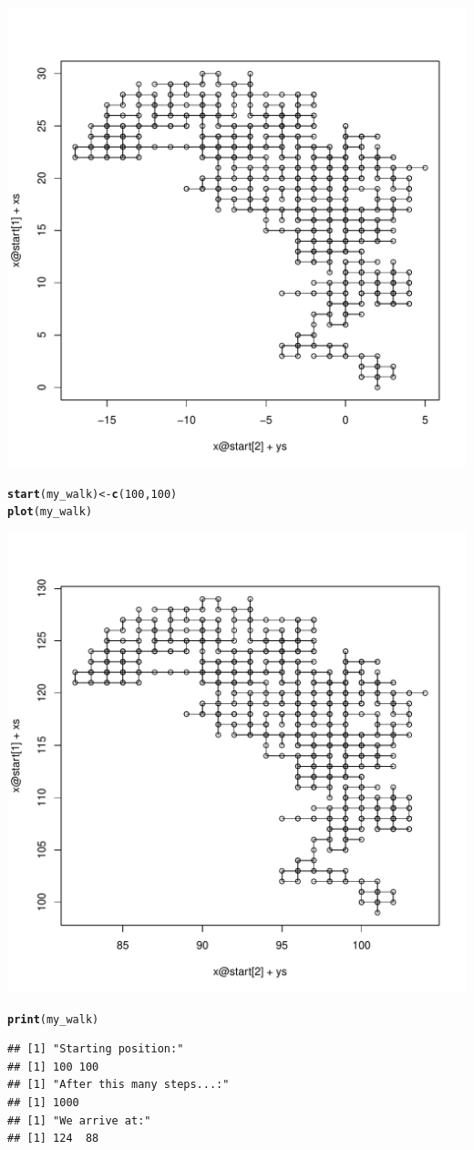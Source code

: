 \documentclass{article}\usepackage[]{graphicx}\usepackage[]{color}
\makeatletter
\def\maxwidth{ %
  \ifdim\Gin@nat@width>\linewidth
    \linewidth
  \else
    \Gin@nat@width
  \fi
}
\newcommand{\hlnum}[1]{\textcolor[rgb]{0.686,0.059,0.569}{#1}}%
\newcommand{\hlstd}[1]{\textcolor[rgb]{0.345,0.345,0.345}{#1}}%
\newcommand{\hlkwb}[1]{\textcolor[rgb]{0.69,0.353,0.396}{#1}}%
\newcommand{\hlkwd}[1]{\textcolor[rgb]{0.737,0.353,0.396}{\textbf{#1}}}%
\newenvironment{kframe}{%
 \def\at@end@of@kframe{}%
 \ifinner\ifhmode%
  \def\at@end@of@kframe{\end{minipage}}%
  \begin{minipage}{\columnwidth}%
 \fi\fi%
 \def\FrameCommand##1{\hskip\@totalleftmargin \hskip-\fboxsep
 \colorbox{shadecolor}{##1}\hskip-\fboxsep
     \hskip-\linewidth \hskip-\@totalleftmargin \hskip\columnwidth}%
 \MakeFramed {\advance\hsize-\width
   \@totalleftmargin\z@ \linewidth\hsize
   \@setminipage}}%
 {\par\unskip\endMakeFramed%
 \at@end@of@kframe}
\newenvironment{knitrout}{}{} %
\makeatother
\begin{document}
\begin{knitrout}
\includegraphics[width=\maxwidth]{figure/unnamed-chunk-2-1} 
\begin{kframe}\begin{alltt}
\hlkwd{start}\hlstd{(my_walk)}\hlkwb{<-}\hlkwd{c}\hlstd{(}\hlnum{100}\hlstd{,}\hlnum{100}\hlstd{)}
\hlkwd{plot}\hlstd{(my_walk)}
\end{alltt}
\end{kframe}
\includegraphics[width=\maxwidth]{figure/unnamed-chunk-2-2} 
\begin{kframe}\begin{alltt}
\hlkwd{print}\hlstd{(my_walk)}
\end{alltt}
\begin{verbatim}
## [1] "Starting position:"
## [1] 100 100
## [1] "After this many steps...:"
## [1] 1000
## [1] "We arrive at:"
## [1] 124  88
\end{verbatim}
\end{kframe}
\end{knitrout}
\end{document}
